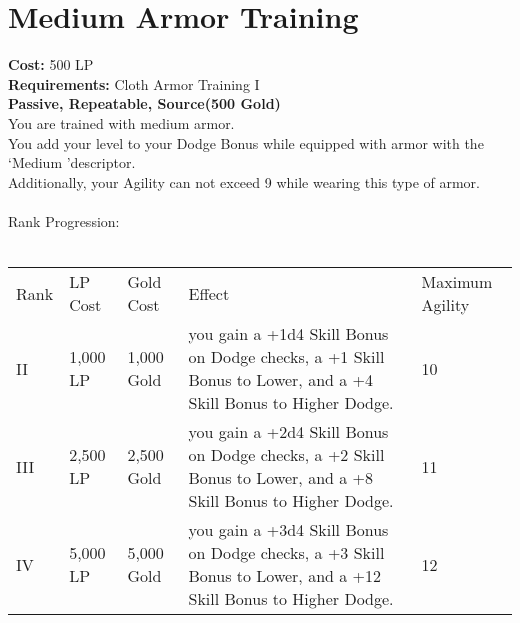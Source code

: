 \section{Medium Armor Training}\label{perk:mediumArmorTraining}
\textbf{Cost:} 500 LP\\
\textbf{Requirements:} Cloth Armor Training I\\
\textbf{Passive, Repeatable, Source(500 Gold)}\\
You are trained with medium armor.\\
You add your level to your Dodge Bonus while equipped with armor with the \lq Medium \rq descriptor.\\
Additionally, your Agility can not exceed 9 while wearing this type of armor.\\
\\
Rank Progression:\\
\\
\begin{longtable}{l | l | l | l | p{9cm}}
	Rank & LP Cost & Gold Cost & Effect & Maximum Agility
	\\
	II
	& 1,000 LP
	& 1,000 Gold
	& you gain a +1d4 Skill Bonus on Dodge checks, a +1 Skill Bonus to Lower, and a +4 Skill Bonus to Higher Dodge.
	& 10
	\\
	III
	& 2,500 LP
	& 2,500 Gold
	& you gain a +2d4 Skill Bonus on Dodge checks, a +2 Skill Bonus to Lower, and a +8 Skill Bonus to Higher Dodge.
	& 11
	\\
	IV
	& 5,000 LP
	& 5,000 Gold
	& you gain a +3d4 Skill Bonus on Dodge checks, a +3 Skill Bonus to Lower, and a +12 Skill Bonus to Higher Dodge.
	& 12
	\\
\end{longtable}